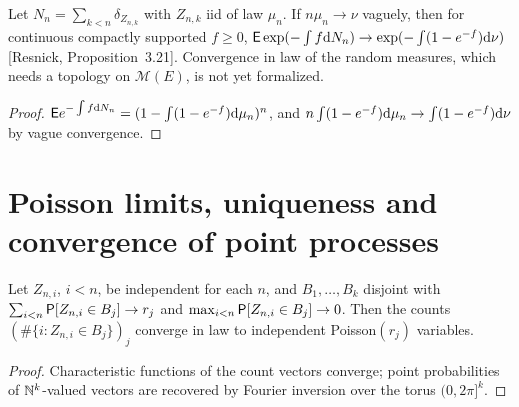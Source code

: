 \begin{theorem}
  \label{thm:binomial-to-poisson}
  \leanok
  Let $N_n = \sum_{k<n} \delta_{Z_{n,k}}$ with $Z_{n,k}$ iid of law $\mu_n$. If $n \mu_n \to \nu$
  vaguely, then for continuous compactly supported $f \ge 0$,
  $\mathsf{E} \exp(-\int f \mathrm{d} N_n) \to \exp(-\int (1 - e^{-f}) \mathrm{d}\nu)$ [Resnick, Proposition~3.21].
  Convergence in law of the random measures, which needs a topology on $\mathcal M(E)$, is not yet
  formalized.
\end{theorem}
\begin{proof}
  \leanok
  $\mathsf{E} e^{-\int f \mathrm{d} N_n} = (1 - \int (1 - e^{-f}) \mathrm{d}\mu_n)^n$, and $n \int (1 - e^{-f}) \mathrm{d}\mu_n \to
  \int (1 - e^{-f}) \mathrm{d}\nu$ by vague convergence.
\end{proof}

\section{Poisson limits, uniqueness and convergence of point processes}

\begin{theorem}
  \label{thm:poisson-limit}
  \leanok
  Let $Z_{n,i}$, $i < n$, be independent for each $n$, and $B_1, \dots, B_k$ disjoint with
  $\sum_{i<n} \mathsf{P}[Z_{n,i} \in B_j] \to r_j$ and $\max_{i<n} \mathsf{P}[Z_{n,i} \in B_j] \to 0$. Then the counts
  $(\#\{i : Z_{n,i} \in B_j\})_j$ converge in law to independent Poisson$(r_j)$ variables.
\end{theorem}
\begin{proof}
  \leanok
  Characteristic functions of the count vectors converge; point probabilities of $\mathbb{N}^k$-valued
  vectors are recovered by Fourier inversion over the torus $(0, 2\pi]^k$.
\end{proof}

